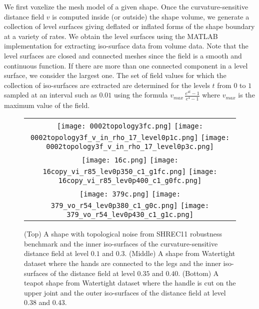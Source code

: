 We first voxelize the mesh model of a given shape. Once the curvature-sensitive distance field $v$ is computed inside (or outside) the shape volume, we generate a collection of level surfaces giving deflated or inflated  forms of the shape boundary at a variety of rates. We obtain the level surfaces using the MATLAB implementation for extracting iso-surface data from volume data. Note that the level surfaces are closed and connected meshes since the field is a smooth and continuous function. If there are more than one connected component in a level surface, we consider the largest one. The set of field values for which the collection of iso-surfaces are extracted are determined for the levels $t$ from $0$ to $1$ sampled at an interval such as $0.01$ using the formula $v_{max}\,\frac{e^{4t}-1}{e^4-1}$ where $v_{max}$ is the maximum value of the field.

\begin{figure}[htb]
  \centering
  \begin{tabular}{c}
  \texttt{[image: 0002topology3fc.png]}
    \texttt{[image: 0002topology3f\_v\_in\_rho\_17\_level0p1c.png]}
    \texttt{[image: 0002topology3f\_v\_in\_rho\_17\_level0p3c.png]}\\
  \texttt{[image: 16c.png]}
    \texttt{[image: 16copy\_vi\_r85\_lev0p350\_c1\_g1fc.png]}
    \texttt{[image: 16copy\_vi\_r85\_lev0p400\_c1\_g0fc.png]}\\
  \texttt{[image: 379c.png]}
  \texttt{[image: 379\_vo\_r54\_lev0p380\_c1\_g0c.png]}
  \texttt{[image: 379\_vo\_r54\_lev0p430\_c1\_g1c.png]}\\
  \end{tabular}
  \caption{\label{fig:fieldisosurfaces}
  (Top) A shape with topological noise from SHREC11 robustness benchmark and the inner iso-surfaces of the curvature-sensitive distance field at level $0.1$ and $0.3$. (Middle) A shape from Watertight dataset where the hands are connected to the legs and the inner iso-surfaces of the distance field at level $0.35$ and $0.40$. (Bottom) A teapot shape from Watertight dataset where the handle is cut on the upper joint and the outer iso-surfaces of the distance field at level $0.38$  and $0.43$.}
\end{figure}

